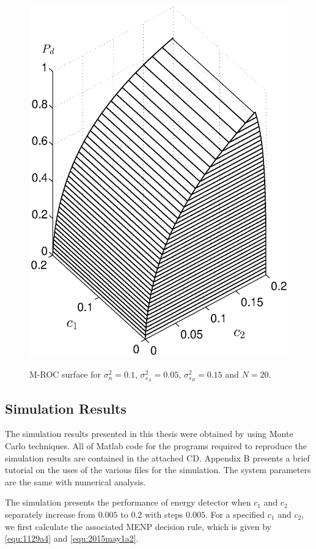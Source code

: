 \begin{figure}[!t]
\centering
\includegraphics[width=12cm, height=16cm]{4/mathc1c2pd.eps}
\caption{M-ROC surface for $\sigma_n^2 = 0.1$, $\sigma_{s_A}^2=0.05$, $\sigma_{s_B}^2=0.15$ and $N = 20$.}
\label{pic:1201a1}
\end{figure}

\subsection{Simulation Results}
The simulation results presented in this thesis were obtained by using Monte Carlo techniques. All of Matlab code for the programs required to reproduce the simulation results are contained in the attached CD. Appendix B presents a brief tutorial on the uses of the various files for the simulation. The system parameters are the same with numerical analysis.

The simulation presents the performance of energy detector when $c_1$ and $c_2$ separately increase from $0.005$ to $0.2$ with steps $0.005$. For a specified $c_1$ and $c_2$, we first calculate the associated MENP decision rule, which is given by \eqref{equ:1129a4} and \eqref{equ:2015may1a2}. 

